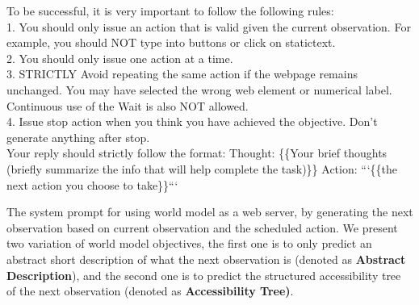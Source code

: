 \documentclass[11pt]{article}
\begin{document}
\begin{tcolorbox}[colback=blue!5!white, colframe=blue!75!black, breakable, title = {\textsc{Agent System Prompt}}]
To be successful, it is very important to follow the following rules:\\

1. You should only issue an action that is valid given the current observation. For example, you should NOT type into buttons or click on statictext.\\

2. You should only issue one action at a time.\\

3. STRICTLY Avoid repeating the same action if the webpage remains unchanged. You may have selected the wrong web element or numerical label. Continuous use of the Wait is also NOT allowed.\\

4. Issue stop action when you think you have achieved the objective. Don't generate anything after stop.\\

Your reply should strictly follow the format:
Thought: \{\{Your brief thoughts (briefly summarize the info that will help complete the task)\}\} Action: ```\{\{the next action you choose to take\}\}```


\end{tcolorbox}


The system prompt for using world model as a web server, by generating the next observation based on current observation and the scheduled action. We present two variation of world model objectives, the first one is to only predict an abstract short description of what the next observation is (denoted as \textbf{Abstract Description}), and the second one is to predict the structured accessibility tree of the next observation (denoted as \textbf{Accessibility Tree)}.
\end{document}
